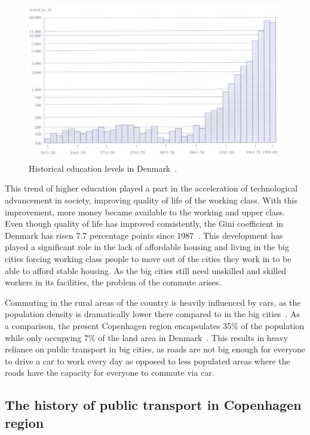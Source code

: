 \begin{figure}
    \centering
    \includegraphics[width=\textwidth]{images/education-levels}
    \caption{Historical education levels in Denmark~\cite{johansen2005}.}
    \label{fig:figure5}
\end{figure}

This trend of higher education played a part in the acceleration of technological advancement in society, improving
quality of life of the working class.
With this improvement, more money became available to the working and upper class.
Even though quality of life has improved consistently, the Gini coefficient in Denmark has risen 7.7 percentage points
since 1987~\cite{cepos2023}.
This development has played a significant role in the lack of affordable housing and living in the big cities forcing
working class people to move out of the cities they work in to be able to afford stable housing.
As the big cities still need unskilled and skilled workers in its facilities, the problem of the commute arises.

Commuting in the rural areas of the country is heavily influenced by cars, as the population density is dramatically
lower there compared to in the big cities~\cite{mulacic2020}.
As a comparison, the present Copenhagen region encapsulates 35\% of the
population while only occupying 7\% of the land area in Denmark~\cite{nielsen&lemberg2017}.
This results in heavy reliance on public transport in big cities, as roads are not big enough for everyone to drive a
car to work every day as opposed to less populated areas where the roads have the capacity for everyone to commute via
car.

\subsection{The history of public transport in Copenhagen region}
\label{subsec:the-history-of-public-transport-in-copenhagen-region}

